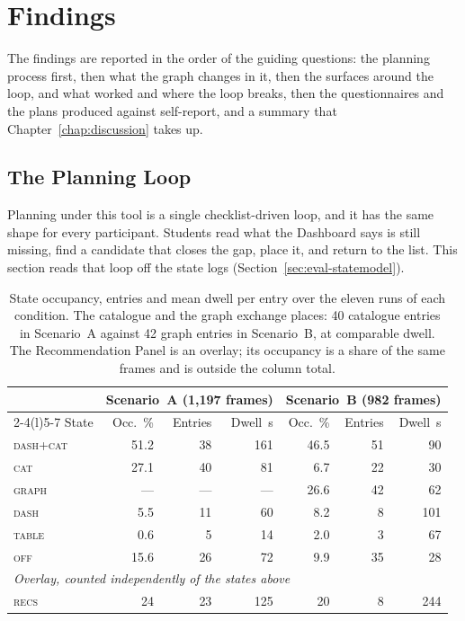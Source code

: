 \section{Findings}
\label{sec:eval-results}

The findings are reported in the order of the guiding questions: the planning process first, then what the graph changes in it, then the surfaces around the loop, and what worked and where the loop breaks, then the questionnaires and the plans produced against self-report, and a summary that Chapter~\ref{chap:discussion} takes up.

\subsection{The Planning Loop}
\label{sec:eval-process}

Planning under this tool is a single checklist-driven loop, and it has the same shape for every participant. Students read what the Dashboard says is still missing, find a candidate that closes the gap, place it, and return to the list. This section reads that loop off the state logs (Section~\ref{sec:eval-statemodel}).

\begin{table}[htpb]
    \centering
    \small
    \begin{tabular}{lrrr@{\hskip 2em}rrr}
        \toprule
        & \multicolumn{3}{c}{Scenario~A (1{,}197 frames)} & \multicolumn{3}{c}{Scenario~B (982 frames)} \\
        \cmidrule(r){2-4}\cmidrule(l){5-7}
        State & Occ.\ \% & Entries & Dwell~s & Occ.\ \% & Entries & Dwell~s \\
        \midrule
        \textsc{dash+cat} & 51.2 & 38 & 161 & 46.5 & 51 & 90 \\
        \textsc{cat}      & 27.1 & 40 &  81 &  6.7 & 22 & 30 \\
        \textsc{graph}    & ---  & ---& --- & 26.6 & 42 & 62 \\
        \textsc{dash}     &  5.5 & 11 &  60 &  8.2 &  8 & 101 \\
        \textsc{table}    &  0.6 &  5 &  14 &  2.0 &  3 & 67 \\
        \textsc{off}      & 15.6 & 26 &  72 &  9.9 & 35 & 28 \\
        \midrule
        \multicolumn{7}{l}{\emph{Overlay, counted independently of the states above}} \\
        \textsc{recs}     & 24   & 23 & 125 & 20   &  8 & 244 \\
        \bottomrule
    \end{tabular}
    \caption{State occupancy, entries and mean dwell per entry over the eleven runs of each condition. The catalogue and the graph exchange places: 40 catalogue entries in Scenario~A against 42 graph entries in Scenario~B, at comparable dwell. The Recommendation Panel is an overlay; its occupancy is a share of the same frames and is outside the column total.}
    \label{tab:occupancy}
\end{table}

